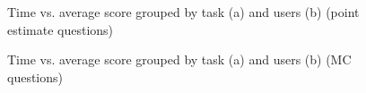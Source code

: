 \documentclass[12pt]{article}
\begin{document}
\begin{figure}[ht!]
     \begin{center}
    \end{center}
    \caption{Time vs. average score grouped by task (a) and users (b) (point estimate questions)}
\end{figure}


\begin{figure}[ht!]
     \begin{center}
    \end{center}
    \caption{Time vs. average score grouped by task (a) and users (b) (MC questions)}
\end{figure}
\end{document}
